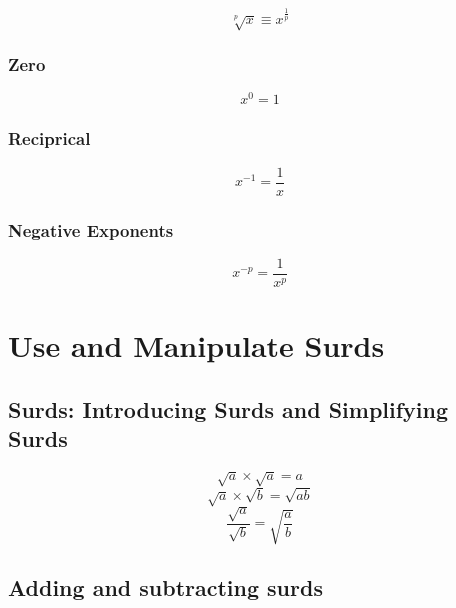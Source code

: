 \documentclass{article}
\begin{document}
\begin{equation}
	\label{simple_equation}
	\sqrt[p]{x} \equiv x^{\frac{1}{p}}
\end{equation}

\subsubsection{Zero}


\begin{equation}
	\label{simple_equation}
	x^0 = 1
\end{equation}

\subsubsection{Reciprical}

\begin{equation}
	\label{simple_equation}
	x^{-1} = \frac{1}{x}
\end{equation}

\subsubsection{Negative Exponents}

\begin{equation}
	\label{simple_equation}
	x^{-p} = \frac{1}{x^p}
\end{equation}


\section{Use and Manipulate Surds}

\subsection{Surds: Introducing Surds and Simplifying Surds}

\begin{equation}
	\label{simple_equation}
	\sqrt{a} \times \sqrt{a} = a
\end{equation}
\begin{equation}
	\label{simple_equation}
	\sqrt{a} \times \sqrt{b} = \sqrt{ab}
\end{equation}
\begin{equation}
	\label{simple_equation}
	\frac{\sqrt{a}}{\sqrt{b}} = \sqrt{\frac{a}{b}}
\end{equation}

\subsection{Adding and subtracting surds}
\end{document}
